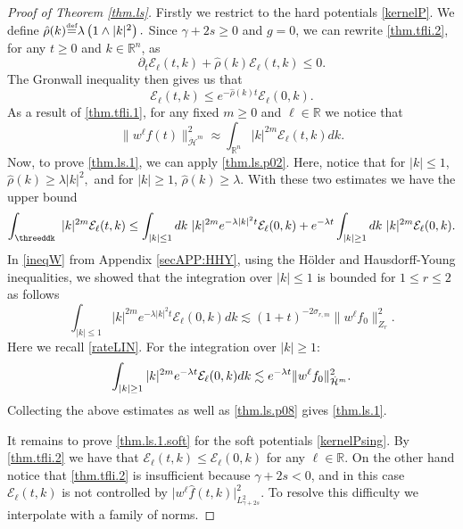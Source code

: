 \documentclass{amsart}
\numberwithin{equation}{section}
\begin{document}
\begin{proof}[Proof of Theorem \ref{thm.ls}]  
Firstly we restrict to the hard potentials \eqref{kernelP}.
We define 
$
  {\hat{\rho}}(k){\overset{\mbox{\tiny{def}}}{=}}
    {\lambda} \left( 1 \wedge |k|^2\right).
$
Since $\gamma + 2s \ge 0$ and ${g}=0$, 
we can rewrite \eqref{thm.tfli.2}, for any $t\geq 0$ and $k\in {{\mathbb R}^{n}}$, as
\begin{equation*}
    {\partial}_t {\mathcal{E}}_{\ell}(t,k)+{\hat{\rho}}(k)  {\mathcal{E}}_{\ell}(t,k)
\le 0.
\end{equation*}
The Gronwall inequality then gives us that
\begin{equation}\label{thm.ls.p02}
   {\mathcal{E}}_{\ell}(t,k)\leq e^{-{\hat{\rho}}(k)t}{\mathcal{E}}_{\ell}(0,k).
\end{equation}
As a result of \eqref{thm.tfli.1}, for any fixed $m\geq 0$ and ${\ell} \in {\mathbb{R}}$ we notice that
\begin{equation}\label{thm.ls.p08}
    \|w^{\ell} {f}(t)\|_{{\dot{\mathcal{H}}}^m}^2 \approx \int_{{\mathbb R}^{n}} |k|^{2m}{\mathcal{E}}_{\ell}(t,k)dk.
\end{equation}
Now, to prove \eqref{thm.ls.1}, we can apply \eqref{thm.ls.p02}.  
Here, notice that for $|k|\leq 1$,
$
{\hat{\rho}}(k)\geq {\lambda}|k|^2,
$
and for $|k|\geq 1$,
$
{\hat{\rho}}(k)\geq {\lambda}.
$
With these two estimates we have the upper bound
$$
 \int_\threeddk~ |k|^{2m}{\mathcal{E}}_{\ell}(t,k) \leq   
 \int_{|k|\leq 1}dk~ |k|^{2m}e^{-{\lambda} |k|^2t}{\mathcal{E}}_{\ell}(0,k)
 +e^{-{\lambda} t} \int_{|k|\geq 1}dk~ |k|^{2m}{\mathcal{E}}_{\ell}(0,k).
$$
In \eqref{ineqW} from Appendix \ref{secAPP:HHY}, using the H\"{o}lder and Hausdorff-Young inequalities, we showed that the integration over $|k|\leq 1$ is bounded for $1\leq r \leq 2$ as follows
$$
 \int_{|k|\leq 1}|k|^{2m}e^{-{\lambda} |k|^2t}{\mathcal{E}}_{\ell}(0,k)dk
\lesssim (1+t)^{-2\sigma_{r,m}}
\|w^{\ell}{f}_0\|_{Z_r}^2.
$$
Here we recall \eqref{rateLIN}.  For the integration over $|k|\geq 1$:
\begin{equation}
\notag
 \int_{|k|\geq 1}|k|^{2m}e^{-{\lambda} t} {\mathcal{E}}_{\ell}(0,k)dk
 \lesssim
 e^{-{\lambda} t} \|w^{\ell}{f}_0\|_{{\dot{\mathcal{H}}}^m}^2.
\end{equation}
Collecting the above estimates as well as \eqref{thm.ls.p08} gives \eqref{thm.ls.1}.

It remains to prove \eqref{thm.ls.1.soft} for the soft potentials \eqref{kernelPsing}.  
By \eqref{thm.tfli.2} we have that
$
\mathcal{E}_{\ell}(t,k)
\le
\mathcal{E}_{\ell}(0,k)
$
for any ${\ell} \in {\mathbb{R}}$.
On the other hand notice that \eqref{thm.tfli.2} is insufficient because $\gamma + 2s < 0$, and in this case $\mathcal{E}_{\ell}(t,k)$ is not controlled by ${|} w^{\ell}  \hat{f}(t,k){|}_{L^2_{\gamma+2s}}^2$.
To resolve this difficulty we interpolate with a family of norms.  


\end{proof}
\end{document}
